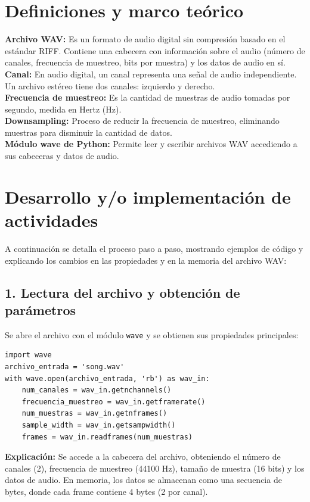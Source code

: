 \documentclass[12pt]{article}
\begin{document}
\section{Definiciones y marco teórico}
\textbf{Archivo WAV:} Es un formato de audio digital sin compresión basado en el estándar RIFF. Contiene una cabecera con información sobre el audio (número de canales, frecuencia de muestreo, bits por muestra) y los datos de audio en sí.\\
\textbf{Canal:} En audio digital, un canal representa una señal de audio independiente. Un archivo estéreo tiene dos canales: izquierdo y derecho.\\
\textbf{Frecuencia de muestreo:} Es la cantidad de muestras de audio tomadas por segundo, medida en Hertz (Hz).\\
\textbf{Downsampling:} Proceso de reducir la frecuencia de muestreo, eliminando muestras para disminuir la cantidad de datos.\\
\textbf{Módulo wave de Python:} Permite leer y escribir archivos WAV accediendo a sus cabeceras y datos de audio.

\section{Desarrollo y/o implementación de actividades}
A continuación se detalla el proceso paso a paso, mostrando ejemplos de código y explicando los cambios en las propiedades y en la memoria del archivo WAV:

\subsection*{1. Lectura del archivo y obtención de parámetros}
Se abre el archivo con el módulo \texttt{wave} y se obtienen sus propiedades principales:

\begin{verbatim}
import wave
archivo_entrada = 'song.wav'
with wave.open(archivo_entrada, 'rb') as wav_in:
    num_canales = wav_in.getnchannels()
    frecuencia_muestreo = wav_in.getframerate()
    num_muestras = wav_in.getnframes()
    sample_width = wav_in.getsampwidth()
    frames = wav_in.readframes(num_muestras)
\end{verbatim}

\textbf{Explicación:} Se accede a la cabecera del archivo, obteniendo el número de canales (2), frecuencia de muestreo (44100 Hz), tamaño de muestra (16 bits) y los datos de audio. En memoria, los datos se almacenan como una secuencia de bytes, donde cada frame contiene 4 bytes (2 por canal).
\end{document}
